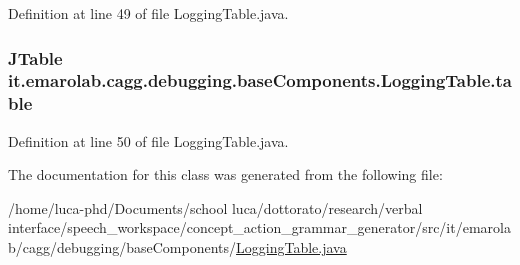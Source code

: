 Definition at line 49 of file Logging\-Table.\-java.

\hypertarget{classit_1_1emarolab_1_1cagg_1_1debugging_1_1baseComponents_1_1LoggingTable_aabf6a15ed4269ae4f62941f909af6322}{
\subsubsection[{table}]{\setlength{\rightskip}{0pt plus 5cm}J\-Table it.\-emarolab.\-cagg.\-debugging.\-base\-Components.\-Logging\-Table.\-table\hspace{0.3cm}{\ttfamily [private]}}}\label{classit_1_1emarolab_1_1cagg_1_1debugging_1_1baseComponents_1_1LoggingTable_aabf6a15ed4269ae4f62941f909af6322}


Definition at line 50 of file Logging\-Table.\-java.



The documentation for this class was generated from the following file\-:\begin{DoxyCompactItemize}
\item 
/home/luca-\/phd/\-Documents/school luca/dottorato/research/verbal interface/speech\-\_\-workspace/concept\-\_\-action\-\_\-grammar\-\_\-generator/src/it/emarolab/cagg/debugging/base\-Components/\hyperlink{LoggingTable_8java}{Logging\-Table.\-java}\end{DoxyCompactItemize}
